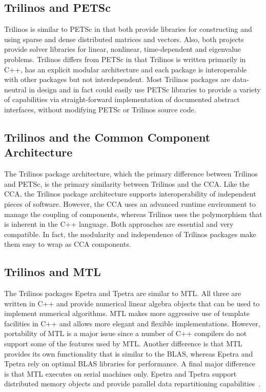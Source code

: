 \documentclass[acmtoms,acmnow]{acmtrans2m}
\begin{document}
\subsection{Trilinos and PETSc}
Trilinos is similar to PETSc in that both provide libraries for
constructing and using sparse and dense distributed matrices and
vectors.  Also, both projects provide solver libraries for linear, nonlinear,
time-dependent and eigenvalue problems.  Trilinos differs from PETSc
in that Trilinos is written primarily in C++, has an explicit
modular architecture and each package is interoperable with other
packages but not interdependent.  Most Trilinos packages are
data-neutral in design and in fact could easily use PETSc libraries to
provide a variety of capabilities via straight-forward implementation
of documented abstract interfaces, without modifying PETSc or Trilinos source code.  

\subsection{Trilinos and the Common Component Architecture}
The Trilinos package architecture, which the primary difference between
Trilinos and PETSc,
is the primary similarity between Trilinos and the CCA.  Like the CCA,
the Trilinos
package architecture supports interoperability of independent
pieces of software.  However, the CCA uses an advanced runtime
environment to manage the coupling of components, whereas Trilinos
uses the polymorphism that is inherent in the C++ language.  Both
approaches are essential and very compatible.  In fact, the modularity
and independence of Trilinos
packages make them easy to wrap as CCA components.

\subsection{Trilinos and MTL}
The Trilinos packages Epetra and Tpetra are similar to MTL.  All three
are written in C++ and provide numerical linear algebra objects
that can be used to implement numerical algorithms.  MTL
makes more aggressive use of template facilities in C++ and allows
more elegant and flexible implementations.  However, portability of
MTL is a major issue since a number of C++ compilers do not 
support some of
the features used by MTL.  Another difference is that MTL provides its
own functionality that is similar to the BLAS, whereas Epetra and
Tpetra rely on optimal BLAS libraries for performance.  A final
major difference is that MTL executes on serial machines only.  
Epetra and Tpetra support distributed
memory objects and provide parallel data repartitioning
capabilities~\cite{Repartitioning}.
\end{document}
